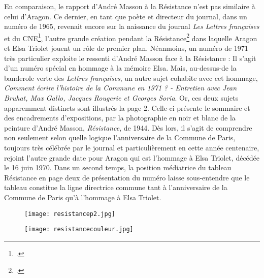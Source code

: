 En comparaison, le rapport d’André Masson à la Résistance n’est pas similaire à celui d’Aragon. Ce dernier, en tant que poète et  directeur du journal, dans un numéro de  1965,  revenait encore  sur la naissance du journal \emph{Les Lettres françaises} et du CNE\footcite{histoirecnetriolet}, l’autre grande création pendant la Résistance\footcite{specialelsa} dans laquelle Aragon et Elsa Triolet jouent un rôle de premier plan. Néanmoins, un numéro de 1971 très particulier exploite le ressenti d’André Masson face à la Résistance : Il s’agit d’un numéro spécial en hommage à la mémoire Elsa. Mais, au-dessus-de la banderole verte des \emph{Lettres françaises}, un autre sujet cohabite avec cet hommage, \emph{Comment écrire l’histoire de la Commune en 1971 ? - Entretien avec Jean Bruhat, Max Gallo, Jacques Rougerie et Georges Soria}. Or, ces deux sujets apparemment distincts sont illustrés la page 2. Celle-ci présente le sommaire et des encadrements d’expositions, par la photographie en noir et blanc de la peinture d’André Masson, \emph{Résistance}, de 1944. Dès lors, il s’agit de comprendre non seulement selon quelle logique l’anniversaire de la Commune de Paris, toujours très célébrée par le journal et particulièrement en cette année centenaire, rejoint l’autre grande date pour Aragon qui est l’hommage à Elsa Triolet, décédée le 16 juin 1970. Dans un second temps, la position médiatrice du tableau Résistance en page deux de présentation du numéro laisse sous-entendre que le tableau constitue la ligne directrice commune tant à l’anniversaire de la Commune de Paris qu’à l’hommage à Elsa Triolet. 


\begin{figure}[H]
   \centering
   \texttt{[image: resistancep2.jpg]}
	\caption{\cite{specialelsa}}\label{fig:Resistance}
\end{figure}

\begin{figure}[H]
   \centering
   \texttt{[image: resistancecouleur.jpg]}
	\caption{\cite{specialelsa}}\label{fig:Resistancecouleur}
\end{figure}


